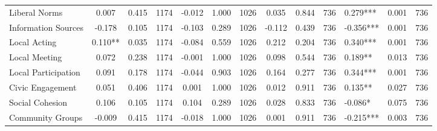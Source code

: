 \begin{tabular}{l*{9}{c}}
 Liberal Norms &        0.007 &        0.415 & 1174       &       -0.012 &        1.000 & 1026 &        0.035 &        0.844 & 736 &        0.279*** &        0.001 & 736 \\ 

 Information Sources &       -0.178 &        0.105 & 1174       &       -0.103 &        0.289 & 1026 &       -0.112 &        0.439 & 736 &       -0.356*** &        0.001 & 736 \\ 

 Local Acting &        0.110** &        0.035 & 1174       &       -0.084 &        0.559 & 1026 &        0.212 &        0.204 & 736 &        0.340*** &        0.001 & 736 \\ 

 Local Meeting &        0.072 &        0.238 & 1174       &       -0.001 &        1.000 & 1026 &        0.098 &        0.544 & 736 &        0.189** &        0.013 & 736 \\ 

 Local Participation &        0.091 &        0.178 & 1174       &       -0.044 &        0.903 & 1026 &        0.164 &        0.277 & 736 &        0.344*** &        0.001 & 736 \\ 

 Civic Engagement &        0.051 &        0.406 & 1174       &        0.001 &        1.000 & 1026 &        0.012 &        0.911 & 736 &        0.135** &        0.027 & 736 \\ 

 Social Cohesion &        0.106 &        0.105 & 1174       &        0.104 &        0.289 & 1026 &        0.028 &        0.833 & 736 &       -0.086* &        0.075 & 736 \\ 

 Community Groups &       -0.009 &        0.415 & 1174       &       -0.018 &        1.000 & 1026 &        0.001 &        0.911 & 736 &       -0.215*** &        0.003 & 736 \\ 

\hline \end{tabular}
